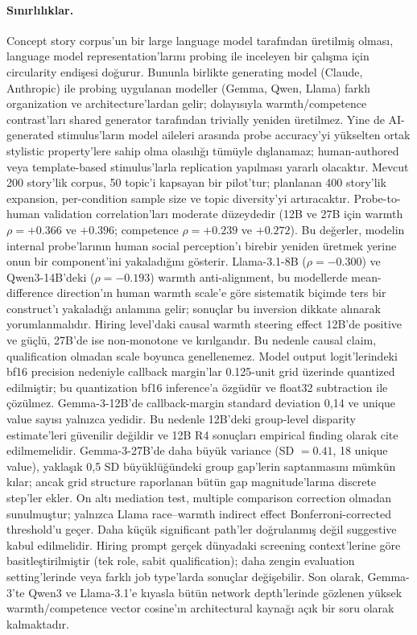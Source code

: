 \documentclass[twocolumn]{article}
\begin{document}
\paragraph{Sınırlılıklar.}
Concept story corpus'un bir large language model tarafından üretilmiş olması,
language model representation'larını probing ile inceleyen bir çalışma için
circularity endişesi doğurur. Bununla birlikte generating model (Claude,
Anthropic) ile probing uygulanan modeller (Gemma, Qwen, Llama) farklı
organization ve architecture'lardan gelir; dolayısıyla warmth/competence
contrast'ları shared generator tarafından trivially yeniden üretilmez. Yine de
AI-generated stimulus'ların model aileleri arasında probe accuracy'yi yükselten
ortak stylistic property'lere sahip olma olasılığı tümüyle dışlanamaz;
human-authored veya template-based stimulus'larla replication yapılması yararlı
olacaktır. Mevcut 200 story'lik corpus, 50 topic'i kapsayan bir pilot'tur;
planlanan 400 story'lik expansion, per-condition sample size ve topic diversity'yi
artıracaktır. Probe-to-human validation correlation'ları moderate düzeydedir
(12B ve 27B için warmth $\rho = +0.366$ ve $+0.396$; competence
$\rho = +0.239$ ve $+0.272$). Bu değerler, modelin internal probe'larının human
social perception'ı birebir yeniden üretmek yerine onun bir component'ini
yakaladığını gösterir. Llama-3.1-8B ($\rho = -0.300$) ve Qwen3-14B'deki
($\rho = -0.193$) warmth anti-alignment, bu modellerde mean-difference
direction'ın human warmth scale'e göre sistematik biçimde ters bir construct'ı
yakaladığı anlamına gelir; sonuçlar bu inversion dikkate alınarak
yorumlanmalıdır. Hiring level'daki causal warmth steering effect 12B'de positive
ve güçlü, 27B'de ise non-monotone ve kırılgandır. Bu nedenle causal claim,
qualification olmadan scale boyunca genellenemez. Model output logit'lerindeki
bf16 precision nedeniyle callback margin'lar 0.125-unit grid üzerinde quantized
edilmiştir; bu quantization bf16 inference'a özgüdür ve float32 subtraction ile
çözülmez. Gemma-3-12B'de callback-margin standard deviation 0,14 ve unique value
sayısı yalnızca yedidir. Bu nedenle 12B'deki group-level disparity estimate'leri
güvenilir değildir ve 12B R4 sonuçları empirical finding olarak cite
edilmemelidir. Gemma-3-27B'de daha büyük variance (SD $= 0.41$, 18 unique value),
yaklaşık 0,5 SD büyüklüğündeki group gap'lerin saptanmasını mümkün kılar; ancak
grid structure raporlanan bütün gap magnitude'larına discrete step'ler ekler.
On altı mediation test, multiple comparison correction olmadan sunulmuştur;
yalnızca Llama race--warmth indirect effect Bonferroni-corrected threshold'u
geçer. Daha küçük significant path'ler doğrulanmış değil suggestive kabul
edilmelidir. Hiring prompt gerçek dünyadaki screening context'lerine göre
basitleştirilmiştir (tek role, sabit qualification); daha zengin evaluation
setting'lerinde veya farklı job type'larda sonuçlar değişebilir. Son olarak,
Gemma-3'te Qwen3 ve Llama-3.1'e kıyasla bütün network depth'lerinde gözlenen
yüksek warmth/competence vector cosine'ın architectural kaynağı açık bir soru
olarak kalmaktadır.
\end{document}
